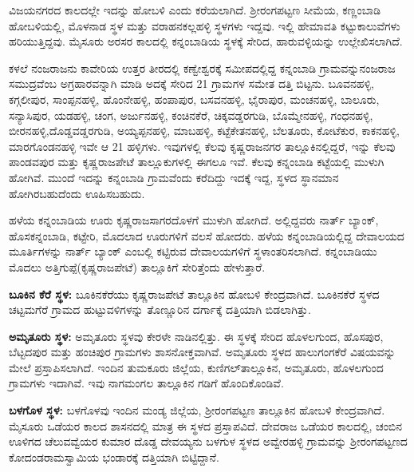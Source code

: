 ವಿಜಯನಗರದ ಕಾಲದಲ್ಲೇ ಇದನ್ನು ಹೋಬಳಿ ಎಂದು ಕರೆಯಲಾಗಿದೆ. ಶ‍್ರೀರಂಗಪಟ್ಟಣ ಸೀಮೆಯ, ಕಣ್ಣಂಬಾಡಿ ಹೋಬಳಿಯಲ್ಲಿ, ಮೊಳನಾಡ ಸ್ಥಳ ಮತ್ತು ವರಾಹನಕಲ್ಲಹಳ್ಳಿ ಸ್ಥಳಗಳು ಇದ್ದವು. ಇಲ್ಲಿ ಹೇಮಾವತಿ ಕಟ್ಟುಕಾಲುವೆಗಳು ಹರಿಯುತ್ತಿದ್ದವು. ಮೈಸೂರು ಅರಸರ ಕಾಲದಲ್ಲಿ ಕನ್ನಂಬಾಡಿಯ ಸ್ಥಳಕ್ಕೆ ಸೇರಿದ, ಹಾರುವಳ್ಳಿಯನ್ನು ಉಲ್ಲೇಖಿಸಲಾಗಿದೆ.

ಕಳಲೆ ನಂಜರಾಜನು ಕಾವೇರಿಯ ಉತ್ತರ ತೀರದಲ್ಲಿ ಕಣ್ವೇಶ್ವರಕ್ಕೆ ಸಮೀಪದಲ್ಲಿದ್ದ ಕನ್ನಂಬಾಡಿ ಗ್ರಾಮವನ್ನು\break ನಂಜರಾಜ ಸಮುದ್ರವೆಂಬ ಅಗ್ರಹಾರವನ್ನಾಗಿ ಮಾಡಿ ಅದಕ್ಕೆ ಸೇರಿದ 21 ಗ್ರಾಮಗಳ ಸಮೇತ ದತ್ತಿ ಬಿಟ್ಟನು. ಬೂವನಹಳ್ಳಿ, ಕಗ್ಗಲೀಪುರ, ಸಾಂಪ್ಪನಹಳ್ಳಿ, ಹೊಂನೇಹಳ್ಳಿ, ಹಂಪಾಪುರ, ಬಸವನಹಳ್ಳಿ, ಭೈರಾಪುರ, ಮಂಚನಹಳ್ಳಿ, ಬಾಲೂರು, ಸನ್ಯಾಸಿಪುರ, ಯಡಹಳ್ಳಿ, ಚಂಗ, ಅರ್ಜುನಹಳ್ಳಿ, ಕಂಚಿನಕೆರೆ, ಚಿಕ್ಕವಡ್ಡರಗುಡಿ, ಬೊಮ್ಮೇನಹಳ್ಳಿ, ಗಂಧನಹಳ್ಳಿ, ಬೀರನಹಳ್ಳಿ,\break ದೊಡ್ಡವಡ್ಡರಗುಡಿ, ಅಯ್ಯಪ್ಪನಹಳ್ಳಿ, ಮಾಬಹಳ್ಳಿ, ಕಟ್ಟೆಕೇತನಹಳ್ಳಿ, ಬೆಲತೂರು, ಕೋಟೆಕುರ, ಕಾಕನಹಳ್ಳಿ, ಮಾರಗೊಂಡನಹಳ್ಳಿ ಇವೇ ಆ 21 ಹಳ್ಳಿಗಳು. ಇವುಗಳಲ್ಲಿ ಕೆಲವು ಕೃಷ್ಣರಾಜನಗರ ತಾಲ್ಲೂಕಿನಲ್ಲಿದ್ದರೆ, ಇನ್ನು ಕೆಲವು ಪಾಂಡವಪುರ ಮತ್ತು ಕೃಷ್ಣರಾಜಪೇಟೆ ತಾಲ್ಲೂಕುಗಳಲ್ಲಿ ಈಗಲೂ ಇವೆ. ಕೆಲವು ಕನ್ನಂಬಾಡಿ ಕಟ್ಟೆಯಲ್ಲಿ ಮುಳುಗಿ ಹೋಗಿವೆ. ಮುಂದೆ ಇದನ್ನು ಕನ್ನಂಬಾಡಿ ಗ್ರಾಮವೆಂದು ಕರೆದಿದ್ದು ಇದಕ್ಕೆ ಇದ್ದ, ಸ್ಥಳದ ಸ್ಥಾನಮಾನ ಹೋಗಿರಬಹುದೆಂದು ಊಹಿಸಬಹುದು.

ಹಳೆಯ ಕನ್ನಂಬಾಡಿಯ ಊರು ಕೃಷ್ಣರಾಜಸಾಗರದೊಳಗೆ ಮುಳುಗಿ ಹೋಗಿದೆ. ಅಲ್ಲಿದ್ದವರು ನಾರ್ತ್ ಬ್ಯಾಂಕ್, ಹೊಸಕನ್ನಂಬಾಡಿ, ಕಟ್ಟೇರಿ, ಮೊದಲಾದ ಊರುಗಳಿಗೆ ವಲಸೆ ಹೋದರು. ಹಳೆಯ ಕನ್ನಂಬಾಡಿಯಲ್ಲಿದ್ದ ದೇವಾಲಯದ ಮೂರ್ತಿಗಳನ್ನು ನಾರ್ತ್ ಬ್ಯಾಂಕ್​ ಎಂಬಲ್ಲಿ ಕಟ್ಟಿರುವ ದೇವಾಲಯಗಳಿಗೆ ಸ್ಥಳಾಂತರಿಸಲಾಗಿದೆ. ಕನ್ನಂಬಾಡಿಯು ಮೊದಲು ಅತ್ತಿಗುಪ್ಪೆ(ಕೃಷ್ಣರಾಜಪೇಟೆ) ತಾಲ್ಲೂಕಿಗೆ ಸೇರಿತ್ತೆಂದು ಹೇಳುತ್ತಾರೆ.

\newpage

\textbf{ಬೂಕಿನ ಕೆರೆ ಸ್ಥಳ:} ಬೂಕಿನಕೆರೆಯು ಕೃಷ್ಣರಾಜಪೇಟೆ ತಾಲ್ಲೂಕಿನ ಹೋಬಳಿ ಕೇಂದ್ರವಾಗಿದೆ. ಬೂಕಿನಕೆರೆ ಸ್ಥಳದ ಚಟ್ಟಮಗೆರೆ ಗ್ರಾಮದ ಹುಟ್ಟುವಳಿಗಳನ್ನು ತೊಣ್ಣೂರಿನ ದರ್ಗಾಕ್ಕೆ ದತ್ತಿಯಾಗಿ ಬಿಡಲಾಗಿತ್ತು.

\textbf{ಅಮೃತೂರು ಸ್ಥಳ:} ಅಮೃತೂರು ಸ್ಥಳವು ಕೇರಳೇ ನಾಡಿನಲ್ಲಿತ್ತು. ಈ ಸ್ಥಳಕ್ಕೆ ಸೇರಿದ ಹೊಳಲಗುಂದ, ಹೊಸಪುರ, ಬೆಟ್ಟದಪುರ ಮತ್ತು ಹಂಚಿಪುರ ಗ್ರಾಮಗಳು ಶಾಸನೋಕ್ತವಾಗಿವೆ. ಅಮೃತೂರು ಸ್ಥಳದ ಹಾಲುಗಂಗಕೆರೆ ವಿಷಯವನ್ನು ಮೇಲೆ ಪ್ರಸ್ತಾಪಿಸಲಾಗಿದೆ. ಇಂದಿನ ತುಮಕೂರು ಜಿಲ್ಲೆಯ, ಕುಣಿಗಲ್​ ತಾಲ್ಲೂಕಿನ, ಅಮೃತೂರು, ಹೊಳಲಗುಂದ ಗ್ರಾಮಗಳು ಇದಾಗಿವೆ. ಇವು ನಾಗಮಂಗಲ ತಾಲ್ಲೂಕಿನ ಗಡಿಗೆ ಹೊಂದಿಕೊಂಡಿವೆ.

\textbf{ಬಳಗೊಳ ಸ್ಥಳ:} ಬಳಗೊಳವು ಇಂದಿನ ಮಂಡ್ಯ ಜಿಲ್ಲೆಯ, ಶ‍್ರೀರಂಗಪಟ್ಟಣ ತಾಲ್ಲೂಕಿನ ಹೋಬಳಿ ಕೇಂದ್ರವಾಗಿದೆ. ಮೈಸೂರು ಒಡೆಯರ ಕಾಲದ ಶಾಸನದಲ್ಲಿ ಮಾತ್ರ ಈ ಸ್ಥಳದ ಪ್ರಸ್ತಾಪವಿದೆ. ದೇವರಾಜ ಒಡೆಯರ ಕಾಲದಲ್ಲಿ, ಚಂಬಿನ ಊಳಿಗದ ಚೆಲುವವ್ವೆಯರ ಕುಮಾರ ದೊಡ್ಡ ದೇವಯ್ಯನು ಬಳಗುಳ ಸ್ಥಳದ ಅವ್ವೇರಹಳ್ಳಿ ಗ್ರಾಮವನ್ನು ಶ‍್ರೀರಂಗಪಟ್ಟಣದ ಕೋದಂಡರಾಮಸ್ವಾಮಿಯ ಭಂಡಾರಕ್ಕೆ ದತ್ತಿಯಾಗಿ ಬಿಟ್ಟಿದ್ದಾನೆ.


